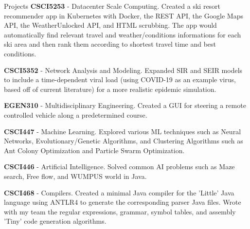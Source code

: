 \documentclass{resume} %
\begin{document}
\begin{rSection}{Projects}
\textbf{CSCI5253} - Datacenter Scale Computing. Created a ski resort recommender app in Kubernetes with Docker, the REST API, the Google Maps API, the WeatherUnlocked API, and HTML scrubbing. The app would automatically find relevant travel and weather/conditions informations for each ski area and then rank them according to shortest travel time and best conditions.

\textbf{CSCI5352} - Network Analysis and Modeling. Expanded SIR and SEIR models to include a time-dependent viral load (using COVID-19 as an example virus, based off of current literature) for a more realistic epidemic simulation.

\textbf{EGEN310} - Multidisciplinary Engineering. Created a GUI for steering a remote controlled vehicle along a predetermined course.

\textbf{CSCI447} - Machine Learning. Explored various ML techniques such as Neural Networks, Evolutionary/Genetic Algorithms, and Clustering Algorithms such as Ant Colony Optimization and Particle Swarm Optimization.

\textbf{CSCI446} - Artificial Intelligence. Solved common AI problems such as Maze search, Free flow, and WUMPUS world in Java.

\textbf{CSCI468} - Compilers. Created a minimal Java compiler for the 'Little' Java language using ANTLR4 to generate the corresponding parser Java files. Wrote with my team the regular expressions, grammar, symbol tables, and assembly 'Tiny' code generation algorithms.
\end{rSection}
\fi
\end{document}
